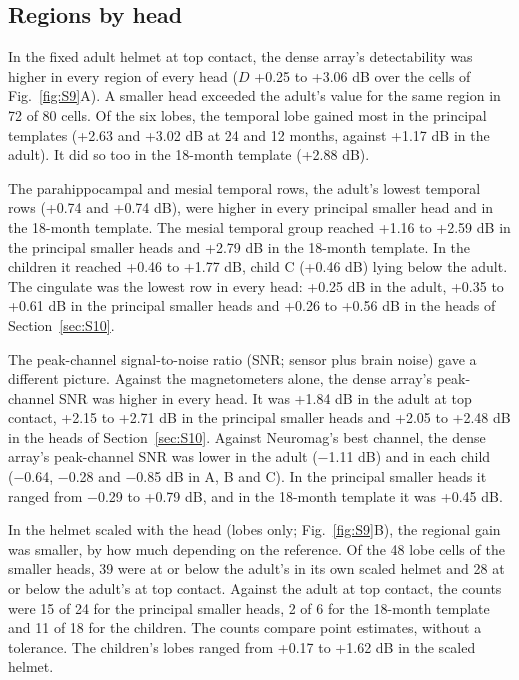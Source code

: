 \documentclass[preprint,12pt,authoryear,a4paper]{elsarticle}
\begin{document}
\subsection{Regions by head}\label{sec:S6.1}

In the fixed adult helmet at top contact, the dense array's detectability was higher in every region of every head ($D$ +0.25 to +3.06 dB over the cells of Fig.~\ref{fig:S9}A). A smaller head exceeded the adult's value for the same region in 72 of 80 cells. Of the six lobes, the temporal lobe gained most in the principal templates (+2.63 and +3.02 dB at 24 and 12 months, against +1.17 dB in the adult). It did so too in the 18-month template (+2.88 dB).

The parahippocampal and mesial temporal rows, the adult's lowest temporal rows (+0.74 and +0.74 dB), were higher in every principal smaller head and in the 18-month template. The mesial temporal group reached +1.16 to +2.59 dB in the principal smaller heads and +2.79 dB in the 18-month template. In the children it reached +0.46 to +1.77 dB, child C (+0.46 dB) lying below the adult. The cingulate was the lowest row in every head: +0.25 dB in the adult, +0.35 to +0.61 dB in the principal smaller heads and +0.26 to +0.56 dB in the heads of Section~\ref{sec:S10}.

The peak-channel signal-to-noise ratio (SNR; sensor plus brain noise) gave a different picture. Against the magnetometers alone, the dense array's peak-channel SNR was higher in every head. It was +1.84 dB in the adult at top contact, +2.15 to +2.71 dB in the principal smaller heads and +2.05 to +2.48 dB in the heads of Section~\ref{sec:S10}. Against Neuromag's best channel, the dense array's peak-channel SNR was lower in the adult (−1.11 dB) and in each child (−0.64, −0.28 and −0.85 dB in A, B and C). In the principal smaller heads it ranged from −0.29 to +0.79 dB, and in the 18-month template it was +0.45 dB.

In the helmet scaled with the head (lobes only; Fig.~\ref{fig:S9}B), the regional gain was smaller, by how much depending on the reference. Of the 48 lobe cells of the smaller heads, 39 were at or below the adult's in its own scaled helmet and 28 at or below the adult's at top contact. Against the adult at top contact, the counts were 15 of 24 for the principal smaller heads, 2 of 6 for the 18-month template and 11 of 18 for the children. The counts compare point estimates, without a tolerance. The children's lobes ranged from +0.17 to +1.62 dB in the scaled helmet.
\end{document}

